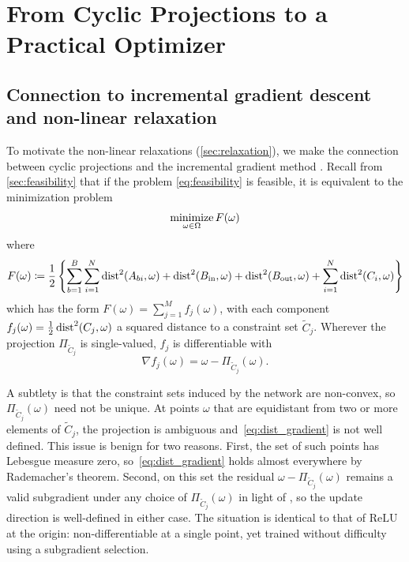 \section{From Cyclic Projections to a Practical Optimizer}

\subsection{Connection to incremental gradient descent and non-linear relaxation }
\label{sec:incremental-grad-descent}
To motivate the non-linear relaxations (\cref{sec:relaxation}), we make the connection between cyclic projections and the incremental gradient method \cite[Section 2.4.1]{bertsekas1997nonlinear}. Recall from \cref{sec:feasibility} that if the problem \eqref{eq:feasibility} is feasible, it is equivalent to the minimization problem
\[
    \operatorname*{minimize}_{\omega\in\Omega} F(\omega)
\]
where
\[
    F(\omega) \coloneqq \frac{1}{2}\left\{\sum_{b=1}^B \sum_{i=1}^N \operatorname{dist}^2(A_{bi}, \omega)   + \operatorname{dist}^2(B_{\mathrm{in}}, \omega) + \operatorname{dist}^2(B_{\mathrm{out}}, \omega) + \sum_{i=1}^N \operatorname{dist}^2(C_i, \omega)\right\}
\]
which has the form $F(\omega) = \sum_{j=1}^{M} f_j(\omega)$, with each component $f_j(\omega) = \frac12\operatorname{dist}^{2}(C_j, \omega)$ a squared distance to a constraint set $\tilde{C}_j$. Wherever the projection $\Pi_{\tilde{C}_j}$ is single-valued, $f_j$ is differentiable with
\begin{equation}
    \nabla f_j(\omega) = \omega - \Pi_{\tilde{C}_j}(\omega).
    \label{eq:dist_gradient}
\end{equation}

A subtlety is that the constraint sets induced by the network are non-convex, so $\Pi_{\tilde{C}_j}(\omega)$ need not be unique. At points $\omega$ that are equidistant from two or more elements of $\tilde{C}_j$, the projection is ambiguous and~\eqref{eq:dist_gradient} is not well defined. This issue is benign for two reasons. First, the set of such points has Lebesgue measure zero, so~\eqref{eq:dist_gradient} holds almost everywhere by Rademacher's theorem. Second, on this set the residual $\omega - \Pi_{\tilde{C}_j}(\omega)$ remains a valid subgradient under any choice of $\Pi_{\tilde{C}_j}(\omega)$ in light of \cite[Proposition 2.1.10]{guidolin2024morse}, so the update direction is well-defined in either case. The situation is identical to that of $\mathrm{ReLU}$ at the origin: non-differentiable at a single point, yet trained without difficulty using a subgradient selection. 

